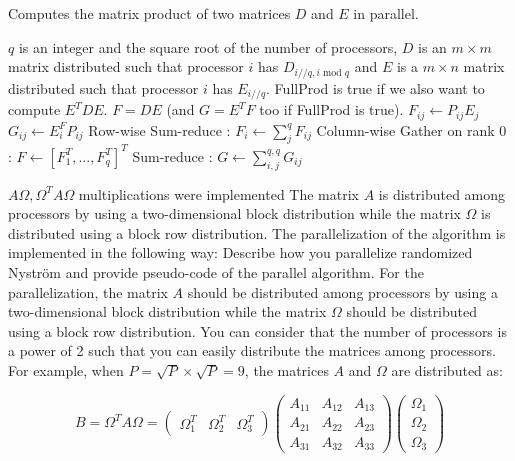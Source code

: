 \documentclass[a4paper, 12pt,oneside]{article}
\begin{document}
	\begin{algorithm}
		\caption{Computes the matrix product of two matrices $D$ and $E$ in parallel.}
		\begin{algorithmic}
		\Require $q$ is an integer and the square root of the number of processors, $D$ is an $m\times m$ matrix distributed such that processor $i$ has $D_{i//q,i\text{ mod }q}$ and $E$ is a $m\times n$ matrix distributed such that processor $i$ has $E_{i//q}$. FullProd is true if we also want to compute $E^TDE$.
		\Ensure $F=DE$ (and $G=E^TF$ too if FullProd is true). 
		\State $F_{ij} \gets P_{ij}E_j$
			\State $G_{ij} \gets E_i^FP_{ij}$
		\EndIf		
		\State Row-wise Sum-reduce : $F_i\gets \sum_j^q F_{ij}$
		\State Column-wise Gather on rank 0 : $F\gets [F_1^T,...,F_q^T]^T$
			\State Sum-reduce : $G\gets \sum_{i,j}^{q,q} G_{ij}$
		\EndIf
		\end{algorithmic}
	\end{algorithm}
	$A \Omega,\Omega^T A \Omega$ multiplications were implemented 
	The matrix $A$ is distributed among processors by using a two-dimensional block distribution while the matrix $\Omega$ is distributed using a block row distribution. The parallelization of the algorithm is implemented in the following way:
	Describe how you parallelize randomized Nyström and provide pseudo-code of the parallel algorithm. For the parallelization, the matrix $A$ should be distributed among processors by using a two-dimensional block distribution while the matrix $\Omega$ should be distributed using a block row distribution. You can consider that the number of processors is a power of 2 such that you can easily distribute the matrices among processors. For example, when $P=\sqrt{P} \times \sqrt{P}=9$, the matrices $A$ and $\Omega$ are distributed as:



	$$
	B=\Omega^T A \Omega=\left(\begin{array}{lll}
		\Omega_1^T & \Omega_2^T & \Omega_3^T
		\end{array}\right)\left(\begin{array}{lll}
		A_{11} & A_{12} & A_{13} \\
		A_{21} & A_{22} & A_{23} \\
		A_{31} & A_{32} & A_{33}
		\end{array}\right)\left(\begin{array}{l}
		\Omega_1 \\
		\Omega_2 \\
		\Omega_3
		\end{array}\right)
	$$
\end{document}
